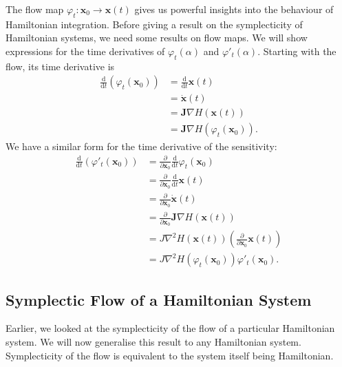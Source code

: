 The flow map $\varphi_t: \mathbf{x}_0 \rightarrow \mathbf{x}(t)$ gives us powerful insights into the behaviour of Hamiltonian integration.
Before giving a result on the symplecticity of Hamiltonian systems, we need some results on flow maps.
We will show expressions for the time derivatives of $\varphi_t(\alpha)$ and $\varphi'_t(\alpha)$.
Starting with the flow, its time derivative is
\begin{align*}
	\frac{\mathrm{d}}{\mathrm{d}t} \left( \varphi_t(\mathbf{x}_0) \right) &= \frac{\mathrm{d}}{\mathrm{d}t} \mathbf{x}(t) \\
	&= \dot{\mathbf{x}}(t) \\
	&= \mathbf{J}\nabla H(\mathbf{x}(t)) \\
	&= \mathbf{J}\nabla H \left( \varphi_t(\mathbf{x}_0) \right).
\end{align*}
We have a similar form for the time derivative of the sensitivity:
\begin{align*}
	\frac{\mathrm{d}}{\mathrm{d}t} \left( \varphi'_t(\mathbf{x}_0) \right) &= \frac{\partial}{\partial \mathbf{x}_0} \frac{\mathrm{d}}{\mathrm{d}t} \varphi_t(\mathbf{x}_0) \\
	&= \frac{\partial}{\partial \mathbf{x}_0} \frac{\mathrm{d}}{\mathrm{d}t} \mathbf{x}(t) \\
	&= \frac{\partial}{\partial \mathbf{x}_0} \dot{\mathbf{x}}(t) \\
	&= \frac{\partial}{\partial \mathbf{x}_0} \mathbf{J}\nabla H(\mathbf{x}(t)) \\
	&= J \nabla^2 H(\mathbf{x}(t)) \left(\frac{\partial}{\partial \mathbf{x}_0} \mathbf{x}(t)\right) \\
	&= J \nabla^2 H(\varphi_t(\mathbf{x}_0))\varphi'_t(\mathbf{x}_0).
\end{align*}

\subsection{Symplectic Flow of a Hamiltonian System}

Earlier, we looked at the symplecticity of the flow of a particular Hamiltonian system.
We will now generalise this result to any Hamiltonian system.
Symplecticity of the flow is equivalent to the system itself being Hamiltonian.

